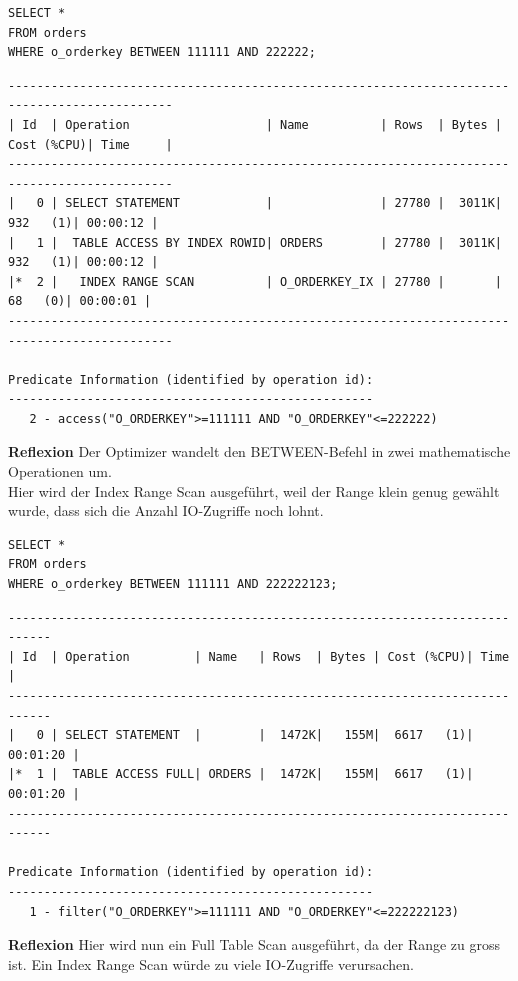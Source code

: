 \documentclass[10pt]{article}
\begin{document}
\begin{lstlisting}[style=sql]
SELECT *
FROM orders
WHERE o_orderkey BETWEEN 111111 AND 222222;
\end{lstlisting}
\begin{lstlisting}[style=queryexecutionplan]
---------------------------------------------------------------------------------------------
| Id  | Operation                   | Name          | Rows  | Bytes | Cost (%CPU)| Time     |
---------------------------------------------------------------------------------------------
|   0 | SELECT STATEMENT            |               | 27780 |  3011K|   932   (1)| 00:00:12 |
|   1 |  TABLE ACCESS BY INDEX ROWID| ORDERS        | 27780 |  3011K|   932   (1)| 00:00:12 |
|*  2 |   INDEX RANGE SCAN          | O_ORDERKEY_IX | 27780 |       |    68   (0)| 00:00:01 |
---------------------------------------------------------------------------------------------

Predicate Information (identified by operation id):
---------------------------------------------------
   2 - access("O_ORDERKEY">=111111 AND "O_ORDERKEY"<=222222)
\end{lstlisting}
\textbf{Reflexion} \newline
Der Optimizer wandelt den BETWEEN-Befehl in zwei mathematische Operationen um.\\
Hier wird der Index Range Scan ausgeführt, weil der Range klein genug gewählt wurde, dass sich die Anzahl IO-Zugriffe noch lohnt.

\begin{lstlisting}[style=sql]
SELECT *
FROM orders
WHERE o_orderkey BETWEEN 111111 AND 222222123;
\end{lstlisting}
\begin{lstlisting}[style=queryexecutionplan]
----------------------------------------------------------------------------
| Id  | Operation         | Name   | Rows  | Bytes | Cost (%CPU)| Time     |
----------------------------------------------------------------------------
|   0 | SELECT STATEMENT  |        |  1472K|   155M|  6617   (1)| 00:01:20 |
|*  1 |  TABLE ACCESS FULL| ORDERS |  1472K|   155M|  6617   (1)| 00:01:20 |
----------------------------------------------------------------------------

Predicate Information (identified by operation id):
---------------------------------------------------
   1 - filter("O_ORDERKEY">=111111 AND "O_ORDERKEY"<=222222123)
\end{lstlisting}
\textbf{Reflexion} \newline
Hier wird nun ein Full Table Scan ausgeführt, da der Range zu gross ist. Ein Index Range Scan würde zu viele IO-Zugriffe verursachen.
\end{document}
